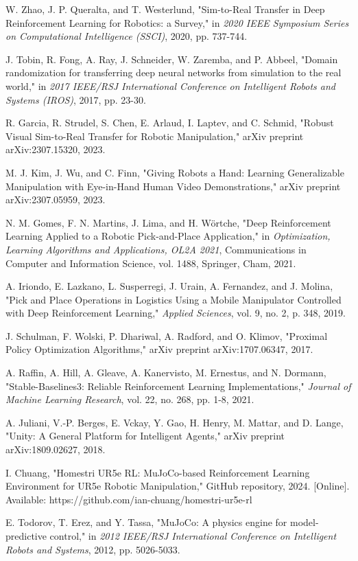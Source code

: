 \documentclass[conference]{IEEEtran}
\begin{document}
\begin{thebibliography}{9}
W. Zhao, J. P. Queralta, and T. Westerlund, "Sim-to-Real Transfer in Deep Reinforcement Learning for Robotics: a Survey," in \emph{2020 IEEE Symposium Series on Computational Intelligence (SSCI)}, 2020, pp. 737-744.

J. Tobin, R. Fong, A. Ray, J. Schneider, W. Zaremba, and P. Abbeel, "Domain randomization for transferring deep neural networks from simulation to the real world," in \emph{2017 IEEE/RSJ International Conference on Intelligent Robots and Systems (IROS)}, 2017, pp. 23-30.

R. Garcia, R. Strudel, S. Chen, E. Arlaud, I. Laptev, and C. Schmid, "Robust Visual Sim-to-Real Transfer for Robotic Manipulation," arXiv preprint arXiv:2307.15320, 2023.

M. J. Kim, J. Wu, and C. Finn, "Giving Robots a Hand: Learning Generalizable Manipulation with Eye-in-Hand Human Video Demonstrations," arXiv preprint arXiv:2307.05959, 2023.

N. M. Gomes, F. N. Martins, J. Lima, and H. Wörtche, "Deep Reinforcement Learning Applied to a Robotic Pick-and-Place Application," in \emph{Optimization, Learning Algorithms and Applications, OL2A 2021}, Communications in Computer and Information Science, vol. 1488, Springer, Cham, 2021.

A. Iriondo, E. Lazkano, L. Susperregi, J. Urain, A. Fernandez, and J. Molina, "Pick and Place Operations in Logistics Using a Mobile Manipulator Controlled with Deep Reinforcement Learning," \emph{Applied Sciences}, vol. 9, no. 2, p. 348, 2019.

J. Schulman, F. Wolski, P. Dhariwal, A. Radford, and O. Klimov, "Proximal Policy Optimization Algorithms," arXiv preprint arXiv:1707.06347, 2017.

A. Raffin, A. Hill, A. Gleave, A. Kanervisto, M. Ernestus, and N. Dormann, "Stable-Baselines3: Reliable Reinforcement Learning Implementations," \textit{Journal of Machine Learning Research}, vol. 22, no. 268, pp. 1-8, 2021.

A. Juliani, V.-P. Berges, E. Vckay, Y. Gao, H. Henry, M. Mattar, and D. Lange, "Unity: A General Platform for Intelligent Agents," arXiv preprint arXiv:1809.02627, 2018.

I. Chuang, "Homestri UR5e RL: MuJoCo-based Reinforcement Learning Environment for UR5e Robotic Manipulation," GitHub repository, 2024. [Online]. Available: https://github.com/ian-chuang/homestri-ur5e-rl

E. Todorov, T. Erez, and Y. Tassa, "MuJoCo: A physics engine for model-predictive control," in \emph{2012 IEEE/RSJ International Conference on Intelligent Robots and Systems}, 2012, pp. 5026-5033.
\end{thebibliography}
\end{document}
